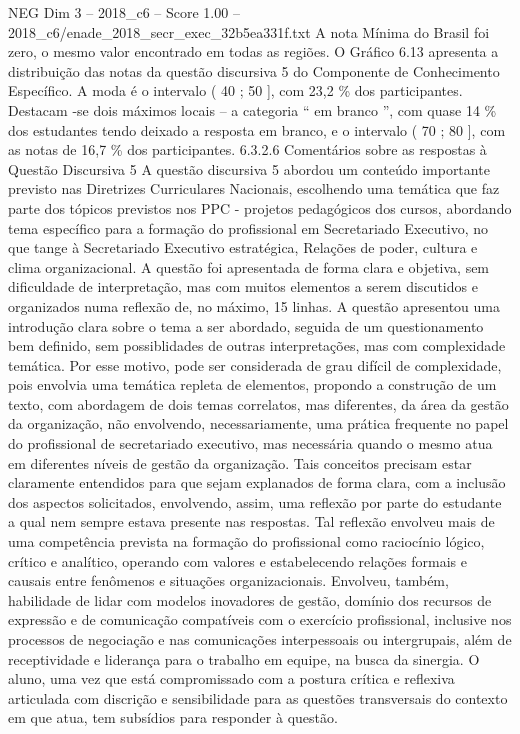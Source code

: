 \begin{textsample}{NEG Dim 3 – 2018\_c6 – Score 1.00 – 2018\_c6/enade\_2018\_secr\_exec\_32b5ea331f.txt}
A nota Mínima do Brasil foi zero, o mesmo valor encontrado em todas as regiões.
O Gráfico 6.13 apresenta a distribuição das notas da questão discursiva 5 do Componente de Conhecimento Específico.
A moda é o intervalo ( 40 ; 50 ], com 23,2 \% dos participantes.
Destacam -se dois máximos locais – a categoria “ em branco ”, com quase 14 \% dos estudantes tendo deixado a resposta em branco, e o intervalo ( 70 ; 80 ], com as notas de 16,7 \% dos participantes. 6.3.2.6 Comentários sobre as respostas à Questão Discursiva 5 A questão discursiva 5 abordou um conteúdo importante previsto nas Diretrizes Curriculares Nacionais, escolhendo uma temática que faz parte dos tópicos previstos nos PPC - projetos pedagógicos dos cursos, abordando tema específico para a formação do profissional em Secretariado Executivo, no que tange à Secretariado Executivo estratégica, Relações de poder, cultura e clima organizacional.
A questão foi apresentada de forma clara e objetiva, sem dificuldade de interpretação, mas com muitos elementos a serem discutidos e organizados numa reflexão de, no máximo, 15 linhas.
A questão apresentou uma introdução clara sobre o tema a ser abordado, seguida de um questionamento bem definido, sem possiblidades de outras interpretações, mas com complexidade temática.
Por esse motivo, pode ser considerada de grau difícil de complexidade, pois envolvia uma temática repleta de elementos, propondo a construção de um texto, com abordagem de dois temas correlatos, mas diferentes, da área da gestão da organização, não envolvendo, necessariamente, uma prática frequente no papel do profissional de secretariado executivo, mas necessária quando o mesmo atua em diferentes níveis de gestão da organização.
Tais conceitos precisam estar claramente entendidos para que sejam explanados de forma clara, com a inclusão dos aspectos solicitados, envolvendo, assim, uma reflexão por parte do estudante a qual nem sempre estava presente nas respostas.
Tal reflexão envolveu mais de uma competência prevista na formação do profissional como raciocínio lógico, crítico e analítico, operando com valores e estabelecendo relações formais e causais entre fenômenos e situações organizacionais.
Envolveu, também, habilidade de lidar com modelos inovadores de gestão, domínio dos recursos de expressão e de comunicação compatíveis com o exercício profissional, inclusive nos processos de negociação e nas comunicações interpessoais ou intergrupais, além de receptividade e liderança para o trabalho em equipe, na busca da sinergia.
O aluno, uma vez que está compromissado com a postura crítica e reflexiva articulada com discrição e sensibilidade para as questões transversais do contexto em que atua, tem subsídios para responder à questão.

\end{textsample}
